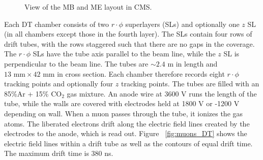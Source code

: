 \documentclass[dissertation.tex]{subfiles}
\begin{document}
\begin{figure}
	\caption{View of the MB and ME layout in CMS.}
	\label{fig:muons_layout}
\end{figure}

Each DT chamber consists of two $r\cdot\phi$ superlayers (SLs) and optionally one $z$ SL (in all chambers except those in the fourth layer).  The SLs contain four rows of drift tubes, with the rows staggered such that there are no gaps in the coverage.  The $r\cdot\phi$ SLs have the tube axis parallel to the beam line, while the $z$ SL is perpendicular to the beam line.  The tubes are $\sim2.4$ m in length and $13\mbox{ mm}\times42\mbox{ mm}$ in cross section.  Each chamber therefore records eight $r\cdot\phi$ tracking points and optionally four $z$ tracking points.  The tubes are filled with an 85\%Ar + 15\% $\mbox{CO}_{2}$ gas mixture.  An anode wire at 3600 V runs the length of the tube, while the walls are covered with electrodes held at 1800 V or -1200 V depending on wall.  When a muon passes through the tube, it ionizes the gas atoms.  The liberated electrons drift along the electric field lines created by the electrodes to the anode, which is read out.  Figure ~\ref{fig:muons_DT} shows the electric field lines within a drift tube as well as the contours of equal drift time.  The maximum drift time is 380 ns.
\end{document}
